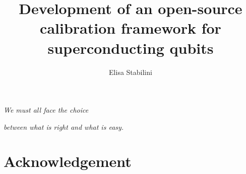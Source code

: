 \documentclass[twoside]{book}
\title{Development of an open-source calibration framework for superconducting qubits}
\author{Elisa Stabilini}
\date{}
\renewcommand{\chaptermark}[1]{\markboth{\chaptername\ \thechapter.\ #1}{}} %
\begin{document}
\frontmatter


\clearpage
\begin{center}
    \thispagestyle{empty}
    \vspace*{\fill}
    \begin{flushright}
    \textit{We must all face the choice}
    \end{flushright}
    \begin{flushright}
    \textit{between what is right and what is easy.}
    \end{flushright}
    \vspace*{\fill}
\end{center}
\clearpage  

\clearpage
\tableofcontents
\clearpage



\mainmatter









\appendix
\cleardoublepage


\backmatter
\printbibliography

\chapter*{Acknowledgement}
\renewcommand{\chaptermark}[1]{\markboth{##1}{}}

\end{document}

